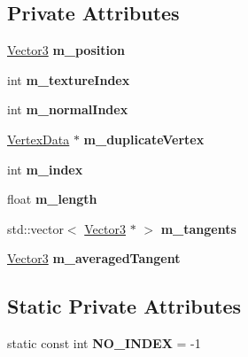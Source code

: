 \subsection*{Private Attributes}
\begin{DoxyCompactItemize}
\item 
\mbox{\label{class_flounder_1_1_vertex_data_a430b98577f1d8ef7765005b17a4238ef}} 
\hyperlink{class_flounder_1_1_vector3}{Vector3} {\bfseries m\+\_\+position}
\item 
\mbox{\label{class_flounder_1_1_vertex_data_ad332ff2f6288dbbc47180167aa6222e8}} 
int {\bfseries m\+\_\+texture\+Index}
\item 
\mbox{\label{class_flounder_1_1_vertex_data_ac9eabe89cc440915de11162afaae5b0f}} 
int {\bfseries m\+\_\+normal\+Index}
\item 
\mbox{\label{class_flounder_1_1_vertex_data_af35ef924a93c355b300a0e89139e31b8}} 
\hyperlink{class_flounder_1_1_vertex_data}{Vertex\+Data} $\ast$ {\bfseries m\+\_\+duplicate\+Vertex}
\item 
\mbox{\label{class_flounder_1_1_vertex_data_a9c8692e615b530adf1a5e48895340151}} 
int {\bfseries m\+\_\+index}
\item 
\mbox{\label{class_flounder_1_1_vertex_data_a81d9ac133b4e7172bb520c3dd35f5ac5}} 
float {\bfseries m\+\_\+length}
\item 
\mbox{\label{class_flounder_1_1_vertex_data_aba0a96d3c3faaab5d5f5bafe1c90799a}} 
std\+::vector$<$ \hyperlink{class_flounder_1_1_vector3}{Vector3} $\ast$ $>$ {\bfseries m\+\_\+tangents}
\item 
\mbox{\label{class_flounder_1_1_vertex_data_a86d685fa1b83e143c8d75b5aeedfa43c}} 
\hyperlink{class_flounder_1_1_vector3}{Vector3} {\bfseries m\+\_\+averaged\+Tangent}
\end{DoxyCompactItemize}
\subsection*{Static Private Attributes}
\begin{DoxyCompactItemize}
\item 
\mbox{\label{class_flounder_1_1_vertex_data_a94c5c555448ddb3650c174d922127a1f}} 
static const int {\bfseries N\+O\+\_\+\+I\+N\+D\+EX} = -\/1
\end{DoxyCompactItemize}


